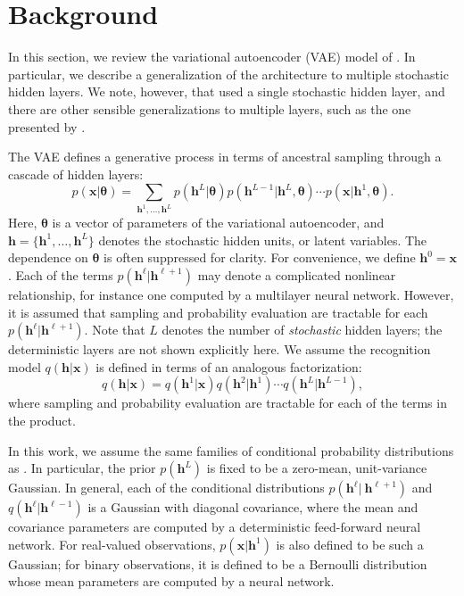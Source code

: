 \documentclass{article} %
\newcommand{\hid}{\mathbf{h}}
\newcommand{\hidLayer}[1]{\hid^{#1}}
\newcommand{\params}{{\boldsymbol{\theta}}}
\newcommand{\obs}{\mathbf{x}}
\newcommand{\numLayers}{L}
\newcommand{\layerIdx}{\ell}
\newcommand{\pmfGen}{p}
\newcommand{\pmfRec}{q}
\begin{document}
\section{Background}
\label{sec:background}

In this section, we review the variational autoencoder (VAE) model of \citet{vae}. In particular, we describe a generalization of the architecture to multiple stochastic hidden layers. We note, however, that \citet{vae} used a single stochastic hidden layer, and there are other sensible generalizations to multiple layers, such as the one presented by \citet{vae2}.

The VAE defines a generative process in terms of ancestral sampling through a cascade of hidden layers:
\begin{equation}
\pmfGen(\obs|\params) = \sum_{\hidLayer{1},\ldots,\hidLayer{\numLayers}} \pmfGen(\hidLayer{\numLayers}|\params) \pmfGen(\hidLayer{\numLayers-1}|\hidLayer{\numLayers},\params)\cdots \pmfGen(\obs|\hidLayer{1},\params). 
\end{equation}
Here, $\params$ is a vector of parameters of the variational autoencoder, and $\hid = \{\hidLayer{1}, \ldots, \hidLayer{\numLayers}\}$ denotes the stochastic hidden units, or latent variables. The dependence on $\params$ is often suppressed for clarity. For convenience, we define $\hidLayer{0} = \obs$. Each of the terms $\pmfGen(\hidLayer{\layerIdx} | \hidLayer{\layerIdx+1})$ may denote a complicated nonlinear relationship, for instance one computed by a multilayer neural network. However, it is assumed that sampling and probability evaluation are tractable for each $\pmfGen(\hidLayer{\layerIdx} | \hidLayer{\layerIdx+1})$. Note that $\numLayers$ denotes the number of \emph{stochastic} hidden layers; the deterministic layers are not shown explicitly here.
We assume the recognition model $\pmfRec(\hid|\obs)$ is defined in terms of an analogous factorization: 
\begin{equation}
\pmfRec(\hid|\obs)=q(\hidLayer{1}|\obs)q(\hidLayer{2}|\hidLayer{1})\cdots \pmfRec(\hidLayer{\numLayers}|\hidLayer{\numLayers-1}),
\end{equation}
where sampling and probability evaluation are tractable for each of the terms in the product.

In this work, we assume the same families of conditional probability distributions as \citet{vae}. In particular, the prior $\pmfGen(\hidLayer{\numLayers})$ is fixed to be a zero-mean, unit-variance Gaussian. In general, each of the conditional distributions $\pmfGen(\hidLayer{\layerIdx} |\ \hidLayer{\layerIdx+1})$ and $\pmfRec(\hidLayer{\layerIdx} | \hidLayer{\layerIdx-1})$ is a Gaussian with diagonal covariance, where the mean and covariance parameters are computed by a deterministic feed-forward neural network. For real-valued observations, $\pmfGen(\obs | \hidLayer{1})$ is also defined to be such a Gaussian; for binary observations, it is defined to be a Bernoulli distribution whose mean parameters are computed by a neural network.
\end{document}
